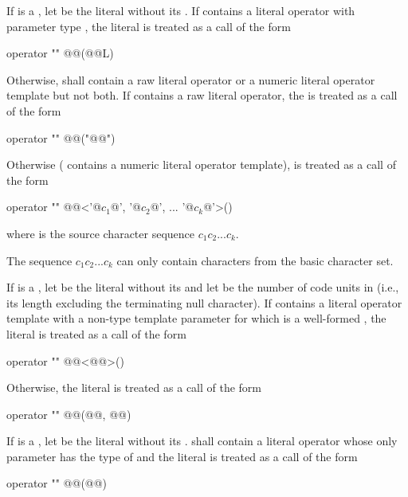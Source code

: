 \pnum
If  is a , let  be the
literal without its . If  contains a literal operator
with parameter type , the literal  is treated as a call of
the form
\begin{codeblock}
operator "" @@(@@L)
\end{codeblock}
Otherwise,  shall contain a raw literal operator
or a numeric literal operator template but not both.
If  contains a raw literal operator,
the   is treated as a call of the form
\begin{codeblock}
operator "" @@("@@")
\end{codeblock}
Otherwise ( contains a numeric literal operator template),
 is treated as a call of the form
\begin{codeblock}
operator "" @@<'@$c_1$@', '@$c_2$@', ... '@$c_k$@'>()
\end{codeblock}
where  is the source character sequence $c_1c_2...c_k$.
\begin{note}
The sequence
$c_1c_2...c_k$ can only contain characters from the basic character set.
\end{note}

\pnum
If  is a ,
let  be the literal without its 
and let  be the number of code units in 
(i.e., its length excluding the terminating null character).
If  contains a literal operator template with
a non-type template parameter for which  is
a well-formed ,
the literal  is treated as a call of the form
\begin{codeblock}
operator "" @@<@@>()
\end{codeblock}
Otherwise, the literal  is treated as a call of the form
\begin{codeblock}
operator "" @@(@@, @@)
\end{codeblock}

\pnum
If  is a , let  be the
literal without its .
 shall contain a literal operator whose only parameter has
the type of  and the
literal  is treated as a call
of the form
\begin{codeblock}
operator "" @@(@@)
\end{codeblock}

